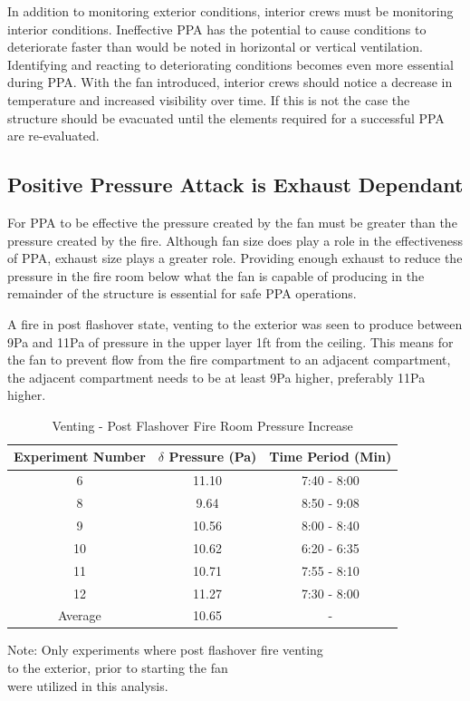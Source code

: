 \documentclass{article}
\begin{document}
In addition to monitoring exterior conditions, interior crews must be monitoring interior conditions. Ineffective PPA has the potential to cause conditions to deteriorate faster than would be noted in horizontal or vertical ventilation. Identifying and reacting to deteriorating conditions becomes even more essential during PPA. With the fan introduced, interior crews should notice a decrease in temperature and increased visibility over time. If this is not the case the structure should be evacuated until the elements required for a successful PPA are re-evaluated.

\subsection{Positive Pressure Attack is Exhaust Dependant} \label{sec:ExhaustDepend}
For PPA to be effective the pressure created by the fan must be greater than the pressure created by the fire. Although fan size does play a role in the effectiveness of PPA, exhaust size plays a greater role. Providing enough exhaust to reduce the pressure in the fire room below what the fan is capable of producing in the remainder of the structure is essential for safe PPA operations.

A fire in post flashover state, venting to the exterior was seen to produce between 9Pa and 11Pa of pressure in the upper layer 1ft from the ceiling. This means for the fan to prevent flow from the fire compartment to an adjacent compartment, the adjacent compartment needs to be at least 9Pa higher, preferably 11Pa higher. 

\begin{table} [H]
	\centering
	\caption{Venting - Post Flashover Fire Room Pressure Increase}
	\centering
	
	\begin{tabular}{|c|c|c|}
		\hline
		Experiment Number & $\delta$ Pressure (Pa) & Time Period (Min) \\ \hline \hline
		6 & 11.10 & 7:40 - 8:00 \\ \hline
		8 & 9.64 & 8:50 - 9:08 \\ \hline
		9 & 10.56 & 8:00 - 8:40 \\ \hline
		10 & 10.62 & 6:20 - 6:35 \\ \hline
		11 & 10.71 & 7:55 - 8:10 \\ \hline
		12 & 11.27 & 7:30 - 8:00 \\ \hline
		Average & 10.65 & -  \\ \hline
	\end{tabular}
	
	\begin{tablenotes}
		\centering
		\item Note: Only experiments where post flashover fire venting \\ to the exterior, prior to starting the fan \\ were utilized in this analysis.
	\end{tablenotes}
	\label{tab:FireRoomPressure}
\end{table}
\end{document}
